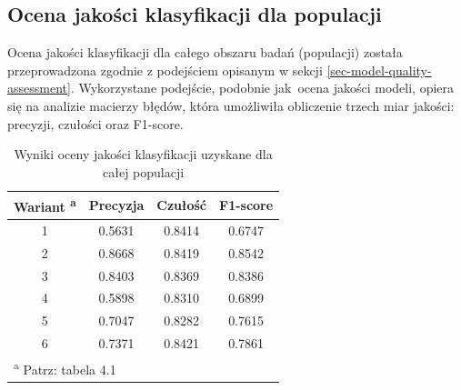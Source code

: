 \documentclass{amuthesis}
\begin{document}
\hypertarget{sec-population-quality-assessment}{%
\subsection{Ocena jakości klasyfikacji dla
populacji}\label{sec-population-quality-assessment}}

Ocena jakości klasyfikacji dla całego obszaru badań (populacji) została
przeprowadzona zgodnie z podejściem opisanym w sekcji
\ref{sec-model-quality-assessment}. Wykorzystane podejście, podobnie
jak~ocena jakości modeli, opiera się na analizie macierzy błędów, która
umożliwiła obliczenie trzech miar jakości: precyzji, czułości oraz
F1-score.

\hypertarget{tbl-tabela-population-quality-assessment}{}
\begin{table}
\caption{\label{tbl-tabela-population-quality-assessment}Wyniki oceny jakości klasyfikacji uzyskane dla całej populacji }\tabularnewline

\centering
\begin{tabular}{cccc}
\toprule
Wariant \textsuperscript{a} & Precyzja & Czułość & F1-score\\
\midrule
1 & 0.5631 & 0.8414 & 0.6747\\
2 & 0.8668 & 0.8419 & 0.8542\\
3 & 0.8403 & 0.8369 & 0.8386\\
4 & 0.5898 & 0.8310 & 0.6899\\
5 & 0.7047 & 0.8282 & 0.7615\\
6 & 0.7371 & 0.8421 & 0.7861\\
\bottomrule
\multicolumn{4}{l}{\textsuperscript{a} Patrz: tabela 4.1}\\
\end{tabular}
\end{table}
\end{document}

